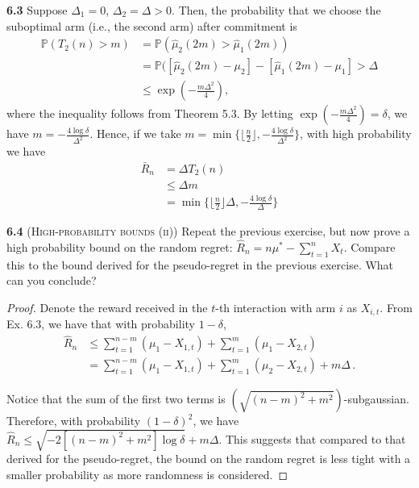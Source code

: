 \noindent\textbf{6.3}
Suppose $\Delta_1 = 0$, $\Delta_2 = \Delta > 0$.
Then, the probability that we choose the suboptimal arm (i.e., the second arm) after commitment is
\begin{equation*}
    \begin{aligned}
        \mathbb{P}(T_{2}(n)>m)
        &= \mathbb{P}(\hat{\mu}_{2}(2 m) > \hat{\mu}_{1}(2 m))\\
        &= \mathbb{P}(\left[\hat{\mu}_{2}(2 m) - \mu_2\right] - \left[\hat{\mu}_{1}(2 m) - \mu_1\right]> \Delta\\
        &\leq \exp(-\frac{m\Delta^2}{4}),
    \end{aligned}
\end{equation*}
where the inequality follows from Theorem 5.3.
By letting $\exp(-\frac{m\Delta^2}{4}) = \delta$, we have $m = -\frac{4\log\delta}{\Delta^2}$.
Hence, if we take $m = \min\{\lfloor \frac{n}{2}\rfloor, -\frac{4\log\delta}{\Delta^2}\}$, with high probability we have
\begin{equation*}
    \begin{aligned}
        \bar{R}_{n}
        &= \Delta T_2(n)\\
        &\leq \Delta m\\
        &= \min\{\lfloor \frac{n}{2}\rfloor \Delta, -\frac{4\log\delta}{\Delta}\}
    \end{aligned}
\end{equation*}

\noindent\textbf{6.4} (\textsc{High-probability bounds (ii)}) Repeat the previous exercise, but now
prove a high probability bound on the random regret: $\hat{R}_n=n\mu^{\ast}-\sum^n_{t=1}X_t$.
Compare this to the bound derived for the pseudo-regret in the previous exercise.
What can you conclude?
\begin{proof}
    Denote the reward received in the $t$-th interaction with arm $i$ as $X_{i, t}$.
    From Ex. 6.3, we have that with probability $1 - \delta$,
    \begin{equation*}
        \begin{aligned}
            \hat{R}_{n}
            &\leq \sum_{t = 1}^{n - m} (\mu_1 - X_{1, t}) + \sum_{t = 1}^{m} (\mu_1 - X_{2, t})\\
            &= \sum_{t = 1}^{n - m} (\mu_1 - X_{1, t}) + \sum_{t = 1}^{m} (\mu_2 - X_{2, t}) + m\Delta\,.
        \end{aligned}
    \end{equation*}
    
    Notice that the sum of the first two terms is $(\sqrt{(n - m)^2 + m^2})$-subgaussian.
    Therefore, with probability $(1 - \delta)^2$, we have $\hat{R}_{n} \leq \sqrt{-2[(n - m)^2 + m^2] \log \delta} + m \Delta$.
    This suggests that compared to that derived for the pseudo-regret, the bound on the random regret is less tight with a smaller probability as more randomness is considered.    
\end{proof}

